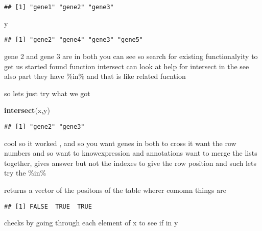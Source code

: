 \documentclass[]{article}
\newenvironment{Shaded}{\begin{snugshade}}{\end{snugshade}}
\newcommand{\KeywordTok}[1]{\textcolor[rgb]{0.13,0.29,0.53}{\textbf{#1}}}
\newcommand{\StringTok}[1]{\textcolor[rgb]{0.31,0.60,0.02}{#1}}
\newcommand{\OperatorTok}[1]{\textcolor[rgb]{0.81,0.36,0.00}{\textbf{#1}}}
\newcommand{\NormalTok}[1]{#1}
\begin{document}
\begin{verbatim}
## [1] "gene1" "gene2" "gene3"
\end{verbatim}

\begin{Shaded}
\begin{Highlighting}[]
\NormalTok{y}
\end{Highlighting}
\end{Shaded}

\begin{verbatim}
## [1] "gene2" "gene4" "gene3" "gene5"
\end{verbatim}

gene 2 and gene 3 are in both you can see so search for existing
functionalyity to get us started found function intersect can look at
help for intersect in the see also part they have \%in\% and that is
like related fucntion

so lets just try what we got

\begin{Shaded}
\begin{Highlighting}[]
\KeywordTok{intersect}\NormalTok{(x,y)}
\end{Highlighting}
\end{Shaded}

\begin{verbatim}
## [1] "gene2" "gene3"
\end{verbatim}

cool so it worked , and so you want genes in both to cross it want the
row numbers and so want to knowexpression and annotations want to merge
the lists together, gives answer but not the indexes to give the row
position and such lets try the \%in\%

returns a vector of the positons of the table wherer comomn things are

\begin{Shaded}
\end{Shaded}

\begin{verbatim}
## [1] FALSE  TRUE  TRUE
\end{verbatim}

checks by going through each element of x to see if in y

\begin{Shaded}
\end{Shaded}
\end{document}
